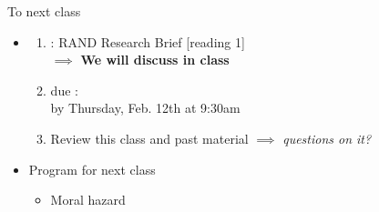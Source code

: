 \begin{frame}{To next class}
    \begin{itemize}
        \item {}
        \begin{enumerate}
            \item {}: RAND Research Brief [reading 1]\\
            $\implies$ \textbf{We will discuss in class}
            \item {} due :\\
            by Thursday, Feb. 12th at 9:30am
            \item Review this class and past material $\implies$ \textit{questions on it?}
        \end{enumerate}
        \vspace{5mm}

        \item Program for next class
        \begin{itemize}
            \item Moral hazard
        \end{itemize}
    \end{itemize}
\end{frame}
